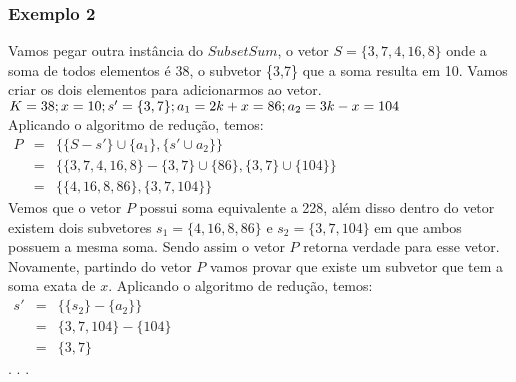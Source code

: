 \documentclass[12pt]{article}
\begin{document}
\subsubsection{Exemplo 2}
Vamos pegar outra instância do $SubsetSum$, o vetor $S = \{3,7, 4,16,8\}$ onde a soma de todos elementos é 38, o subvetor \{3,7\} que a soma resulta em 10. Vamos criar os dois elementos para adicionarmos ao vetor.\\
$K = 38;\\x = 10;\\s' = \{3,7\};\\a_1 = 2k + x = 86;\\a_2 = 3k - x = 104$\\
Aplicando o algoritmo de redução, temos:\\
$\begin{matrix}
P &=& \{\{S - s'\} \cup \{a_1\} , \{s' \cup a_2\}\}\\
\ &=& \{\{3,7,4,16,8\} - \{3,7\} \cup \{86\}, \{3,7\} \cup \{104\}\}\\
\ &=& \{\{4,16,8,86\} , \{3,7,104\}\}
\end{matrix}$\\
Vemos que o vetor $P$ possui soma equivalente a 228, além disso dentro do vetor existem dois subvetores $s_1 = \{4,16,8,86\}$ e $s_2 = \{3,7,104\}$ em que ambos possuem a mesma soma. Sendo assim o vetor $P$ retorna verdade para esse vetor.\\
Novamente, partindo do vetor $P$ vamos provar que existe um subvetor que tem a soma exata de $x$. Aplicando o algoritmo de redução, temos:\\
$\begin{matrix}
s' &=& \{\{s_2\} - \{a_2\}\}\\
\ &=& \{3,7,104\} - \{104\}\\
\ &=& \{3,7\}
\end{matrix}$\\


\cite{hwsoln13}.
\cite{cs360}.
\cite{wiki}.
\end{document}
